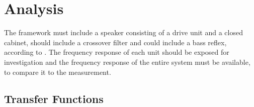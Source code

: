 \section{Analysis}
The framework must include a speaker consisting of a drive unit and a closed cabinet, should include a crossover filter and could include a bass reflex, according to .
The frequency response of each unit should be exposed 
for investigation and the frequency response of the entire system must be available, to compare it to the measurement.

\subsection{Transfer Functions}
